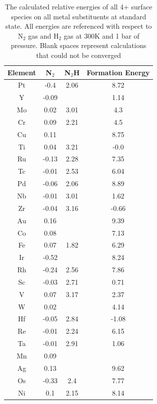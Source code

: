 \documentclass{article}
\begin{document}
\begin{table}
\begin{center}
\begin{tabular}{| c | c | c | c |}
\hline
Element & N$_2$ & N$_2$H & Formation Energy \\
\hline
Pt & -0.4 & 2.06 & 8.72 \\
Y & -0.09 &  & 1.14 \\
Mo & 0.02 & 3.01 & 4.3 \\
Cr & 0.09 & 2.21 & 4.5 \\
Cu & 0.11 &  & 8.75 \\
Ti & 0.04 & 3.21 & -0.0 \\
Ru & -0.13 & 2.28 & 7.35 \\
Tc & -0.01 & 2.53 & 6.04 \\
Pd & -0.06 & 2.06 & 8.89 \\
Nb & -0.01 & 3.01 & 1.62 \\
Zr & -0.04 & 3.16 & -0.66 \\
Au & 0.16 &  & 9.39 \\
Co & 0.08 &  & 7.13 \\
Fe & 0.07 & 1.82 & 6.29 \\
Ir & -0.52 &  & 8.24 \\
Rh & -0.24 & 2.56 & 7.86 \\
Sc & -0.03 & 2.71 & 0.71 \\
V & 0.07 & 3.17 & 2.37 \\
W & 0.02 &  & 4.14 \\
Hf & -0.05 & 2.84 & -1.08 \\
Re & -0.01 & 2.24 & 6.15 \\
Ta & -0.01 & 2.91 & 1.06 \\
Mn & 0.09 &  &  \\
Ag & 0.13 &  & 9.62 \\
Os & -0.33 & 2.4 & 7.77 \\
Ni & 0.1 & 2.15 & 8.14 \\
\hline
\end{tabular}
\end{center}
\label{table:4+_energies}
\caption{The calculated relative energies of all 4+ surface species on all metal substituents at standard state. All energies are referenced with respect to N$_2$ gas and H$_2$ gas at 300K and 1 bar of pressure. Blank spaces represent calculations that could not be converged}
\end{table}
\end{document}
